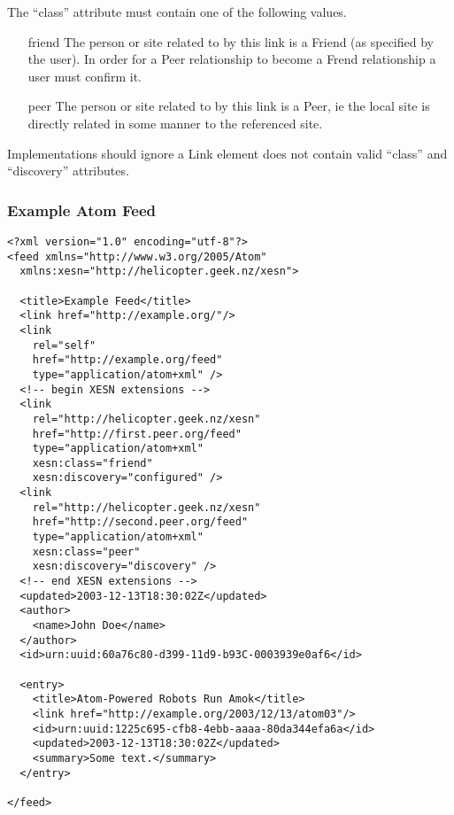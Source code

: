 \documentclass[titlepage,english,a4paper,twoside,dvips]{article}
\begin{document}
The ``class'' attribute must contain one of the following values.

\begin{itemize}

\item[friend] The person or site related to by this link is a Friend (as specified by the user).  In order for a Peer relationship to become a Frend relationship a user must confirm it.

\item[peer] The person or site related to by this link is a Peer, ie the local site is directly related in some manner to the referenced site.

\end{itemize}

Implementations should ignore a Link element does not contain valid ``class'' and ``discovery'' attributes.

\subsubsection{Example Atom Feed}

\begin{verbatim}
<?xml version="1.0" encoding="utf-8"?>
<feed xmlns="http://www.w3.org/2005/Atom" 
  xmlns:xesn="http://helicopter.geek.nz/xesn">

  <title>Example Feed</title>
  <link href="http://example.org/"/>
  <link 
    rel="self" 
    href="http://example.org/feed" 
    type="application/atom+xml" />
  <!-- begin XESN extensions -->
  <link 
    rel="http://helicopter.geek.nz/xesn" 
    href="http://first.peer.org/feed" 
    type="application/atom+xml"
    xesn:class="friend"
    xesn:discovery="configured" />
  <link 
    rel="http://helicopter.geek.nz/xesn" 
    href="http://second.peer.org/feed" 
    type="application/atom+xml"
    xesn:class="peer"
    xesn:discovery="discovery" />
  <!-- end XESN extensions -->
  <updated>2003-12-13T18:30:02Z</updated>
  <author>
    <name>John Doe</name>
  </author>
  <id>urn:uuid:60a76c80-d399-11d9-b93C-0003939e0af6</id>

  <entry>
    <title>Atom-Powered Robots Run Amok</title>
    <link href="http://example.org/2003/12/13/atom03"/>
    <id>urn:uuid:1225c695-cfb8-4ebb-aaaa-80da344efa6a</id>
    <updated>2003-12-13T18:30:02Z</updated>
    <summary>Some text.</summary>
  </entry>

</feed>
\end{verbatim}

\clearpage
\end{document}
